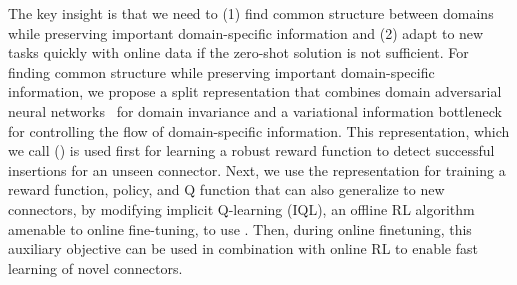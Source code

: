 The key insight is that we need to (1) find common structure between domains while preserving important domain-specific information and (2) adapt to new tasks quickly with online data if the zero-shot solution is not sufficient.
For finding common structure while preserving important domain-specific information, we propose a split representation that combines domain adversarial neural networks~\cite{ganin2016domainadversarial} for domain invariance and a variational information bottleneck~\cite{alemi2017vib}
for controlling the flow of domain-specific information.
This representation, which we call \methodname{} (\methodabbrv) is used first for learning a robust reward function to detect successful insertions for an unseen connector.
Next, we use the representation for training a reward function, policy, and Q function that can also generalize to new connectors, by modifying implicit Q-learning (IQL), an offline RL algorithm amenable to online fine-tuning, to use \methodabbrv{}.
Then, during online finetuning, this auxiliary objective can be used in combination with online RL to enable fast learning of novel connectors.


